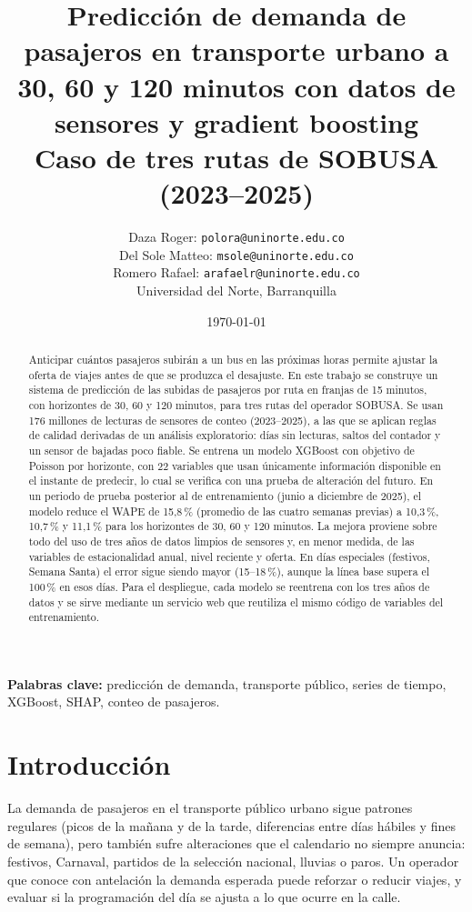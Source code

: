 \documentclass[11pt,a4paper]{article}
\title{\textbf{Predicción de demanda de pasajeros en transporte urbano a 30, 60 y 120 minutos con datos de sensores y gradient boosting}\\[0.4em]
\large Caso de tres rutas de SOBUSA (2023--2025)}
\author{Daza Roger: \texttt{polora@uninorte.edu.co}\\
Del Sole Matteo: \texttt{msole@uninorte.edu.co}\\
Romero Rafael: \texttt{arafaelr@uninorte.edu.co}\\[0.3em]
\small Universidad del Norte, Barranquilla}
\date{\today}
\begin{document}
\maketitle

\begin{abstract}
Anticipar cuántos pasajeros subirán a un bus en las próximas horas permite ajustar la oferta de viajes antes de que se produzca el desajuste. En este trabajo se construye un sistema de predicción de las subidas de pasajeros por ruta en franjas de 15 minutos, con horizontes de 30, 60 y 120 minutos, para tres rutas del operador SOBUSA. Se usan 176 millones de lecturas de sensores de conteo (2023--2025), a las que se aplican reglas de calidad derivadas de un análisis exploratorio: días sin lecturas, saltos del contador y un sensor de bajadas poco fiable. Se entrena un modelo XGBoost con objetivo de Poisson por horizonte, con 22 variables que usan únicamente información disponible en el instante de predecir, lo cual se verifica con una prueba de alteración del futuro. En un periodo de prueba posterior al de entrenamiento (junio a diciembre de 2025), el modelo reduce el WAPE de 15,8\,\% (promedio de las cuatro semanas previas) a 10,3\,\%, 10,7\,\% y 11,1\,\% para los horizontes de 30, 60 y 120 minutos. La mejora proviene sobre todo del uso de tres años de datos limpios de sensores y, en menor medida, de las variables de estacionalidad anual, nivel reciente y oferta. En días especiales (festivos, Semana Santa) el error sigue siendo mayor (15--18\,\%), aunque la línea base supera el 100\,\% en esos días. Para el despliegue, cada modelo se reentrena con los tres años de datos y se sirve mediante un servicio web que reutiliza el mismo código de variables del entrenamiento.
\end{abstract}

\noindent\textbf{Palabras clave:} predicción de demanda, transporte público, series de tiempo, XGBoost, SHAP, conteo de pasajeros.

\section{Introducción}

La demanda de pasajeros en el transporte público urbano sigue patrones regulares (picos de la mañana y de la tarde, diferencias entre días hábiles y fines de semana), pero también sufre alteraciones que el calendario no siempre anuncia: festivos, Carnaval, partidos de la selección nacional, lluvias o paros. Un operador que conoce con antelación la demanda esperada puede reforzar o reducir viajes, y evaluar si la programación del día se ajusta a lo que ocurre en la calle.
\end{document}

